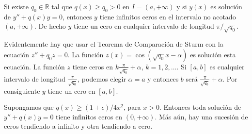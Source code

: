 \begin{corolario} Si existe $q_0\in\mathbb{R}$ tal que  $q(x)\geq q_0>0$ en $I=(a,+\infty)$ y si  $y(x)$ es solución de $y''+q(x)y=0$, entonces $y$ tiene infinitos ceros en el intervalo no acotado $(a,+\infty)$. De hecho $y$ tiene un cero en cualquier intervalo de longitud $\pi/\sqrt{q_0}$.
\end{corolario}
\begin{demo}  Evidentemente hay que usar el Teorema de Comparación de Sturm con la ecuación $z''+q_0z=0$. La función  $z(x)=\cos(\sqrt{q_0}x-\alpha)$ es solución  esta ecuación. La función $z$ tiene ceros en  $k\frac{\pi}{\sqrt{q_0}}+\alpha$, $k=1,2,\ldots$. Si $[a,b]$ es cualquier intervalo de longitud $ \frac{\pi}{\sqrt{q_0}}$, podemos elegir $\alpha=a$ y entonces $b$ será $\frac{\pi}{\sqrt{q_0}}+\alpha$. Por consiguiente $y$ tiene un cero en $[a,b]$.
\end{demo}



\begin{corolario} Supongamos que $q(x)\geq (1+\epsilon)/4x^2$, para $x>0$. Entonces toda solución de 
$y''+q(x)y=0$ tiene infinitos ceros en $(0,+\infty)$. Más aún, hay una sucesión de ceros tendiendo a infinito y otra tendiendo a cero.
\end{corolario}


